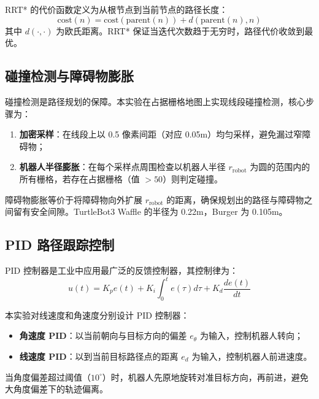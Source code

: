\documentclass{SYSUReport}
\begin{document}
RRT* 的代价函数定义为从根节点到当前节点的路径长度：
\begin{equation}
    \text{cost}(n) = \text{cost}(\text{parent}(n)) + d(\text{parent}(n), n)
\end{equation}
其中 $d(\cdot, \cdot)$ 为欧氏距离。RRT* 保证当迭代次数趋于无穷时，路径代价收敛到最优。

\subsection{碰撞检测与障碍物膨胀}

碰撞检测是路径规划的保障。本实验在占据栅格地图上实现线段碰撞检测，核心步骤为：

\begin{enumerate}
    \item \textbf{加密采样}：在线段上以 0.5 像素间距（对应 0.05m）均匀采样，避免漏过窄障碍物；
    \item \textbf{机器人半径膨胀}：在每个采样点周围检查以机器人半径 $r_{\text{robot}}$ 为圆的范围内的所有栅格，若存在占据栅格（值 $> 50$）则判定碰撞。
\end{enumerate}

障碍物膨胀等价于将障碍物向外扩展 $r_{\text{robot}}$ 的距离，确保规划出的路径与障碍物之间留有安全间隙。TurtleBot3 Waffle 的半径为 0.22m，Burger 为 0.105m。

\subsection{PID 路径跟踪控制}

PID 控制器是工业中应用最广泛的反馈控制器，其控制律为：
\begin{equation}
    u(t) = K_p e(t) + K_i \int_0^t e(\tau) d\tau + K_d \frac{de(t)}{dt}
\end{equation}

本实验对线速度和角速度分别设计 PID 控制器：

\begin{itemize}
    \item \textbf{角速度 PID}：以当前朝向与目标方向的偏差 $e_\theta$ 为输入，控制机器人转向；
    \item \textbf{线速度 PID}：以到当前目标路径点的距离 $e_d$ 为输入，控制机器人前进速度。
\end{itemize}

当角度偏差超过阈值（$10^\circ$）时，机器人先原地旋转对准目标方向，再前进，避免大角度偏差下的轨迹偏离。

\end{document}
